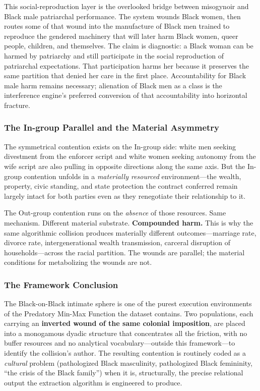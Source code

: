 This social-reproduction layer is the overlooked bridge between misogynoir and Black male patriarchal performance. The system wounds Black women, then routes some of that wound into the manufacture of Black men trained to reproduce the gendered machinery that will later harm Black women, queer people, children, and themselves. The claim is diagnostic: a Black woman can be harmed by patriarchy and still participate in the social reproduction of patriarchal expectations. That participation harms her because it preserves the same partition that denied her care in the first place. Accountability for Black male harm remains necessary; alienation of Black men as a class is the interference engine's preferred conversion of that accountability into horizontal fracture.

\subsubsection*{The In-group Parallel and the Material Asymmetry}

The symmetrical contention exists on the In-group side: white men seeking divestment from the enforcer script and white women seeking autonomy from the wife script are also pulling in opposite directions along the same axis. But the In-group contention unfolds in a \textit{materially resourced} environment---the wealth, property, civic standing, and state protection the contract conferred remain largely intact for both parties even as they renegotiate their relationship to it.

The Out-group contention runs on the \textit{absence} of those resources. Same mechanism. Different material substrate. \textbf{Compounded harm.} This is why the same algorithmic collision produces materially different outcomes---marriage rate, divorce rate, intergenerational wealth transmission, carceral disruption of households---across the racial partition. The wounds are parallel; the material conditions for metabolizing the wounds are not.

\subsubsection*{The Framework Conclusion}

The Black-on-Black intimate sphere is one of the purest execution environments of the Predatory Min-Max Function the dataset contains. Two populations, each carrying an \textbf{inverted wound of the same colonial imposition}, are placed into a monogamous dyadic structure that concentrates all the friction, with no buffer resources and no analytical vocabulary---outside this framework---to identify the collision's author. The resulting contention is routinely coded as a \textit{cultural} problem (pathologized Black masculinity, pathologized Black femininity, ``the crisis of the Black family'') when it is, structurally, the precise relational output the extraction algorithm is engineered to produce.


